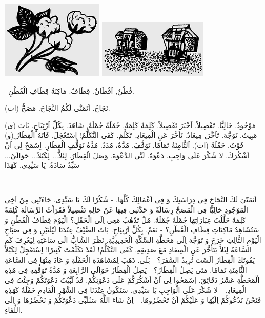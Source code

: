 \documentclass[a5paper]{article}
\begin{document}
 \includegraphics[width=1.9272in,height=1.4689in]{MuhammadBagauddinlatinized-img221.png}   \includegraphics[width=2.0626in,height=1.1043in]{MuhammadBagauddinlatinized-img222.png} 

\ قُطْنٌ, اَقْطَانٌ. قِطَافٌ. مَاكِنَةُ قِطَافِ الْقُطْنِ. 

نَجَاحٌ. اَتَمَنَّى لَكُمُ النَّجَاحَ. مَصَحٌّّ (ات).

مَوْجُودٌ. حَالِيًّا. تَفْصِيلاً. اَخْبَرَ تَفْصِيلاً. كَلِمَةً كَلِمَةً. جُمْلَةً جُمْلَةً. شَاهَدَ. بِكُلِّ اَرْتِيَاحٍ. بَاتَ (ى) مَبِيتٌ. تَوَجَّهَ. تَاَخَّرَ.ِ مِيعَادٌ. تَاَخَّرَ عَنِ الْمِيعَادِ. تَكَلَّمَ. كَفَى التَّكَلُّمُ! اِسْتَعْجَلَ. فَاتَهُ الْقِطَارُ ِ(و) فَوْتٌ. حَفْلَةٌ (ات). اَلثَّامِنَةُ تَمَامًا. تَوَقَّفَ. مُدَّةٌ، مُدَدٌ. مُدَّةُ تَوَقُّفِ الْقِطَارِ. اِسْمَحْ لِى اَنْ اَشْكُرَكَ. لا شُكْرَ عَلَى وَاجِبٍ. دَعْوَةٌ. لَبَّى الدَّعْوَةَ. وَصَلَ الْقِطَارُ. لِئَلاَّ... لِكَيْلاَ... حَوَالَىْ... سَيِّدٌ سَادَةٌ. يَا سَيِّدِى. كَهَذَا

\_\_\_\_\_\_\_\_\_\_\_\_\_\_\_\_\_\_\_\_\_\_\_\_\_\_

اَتَمَنّىَ لَكَ النَّجَاحَ فِى دِرَاسَتِكَ وَ فِى اَعْمَالِكَ كُلِّهَا. - شُكْرًا لَكَ يَا سَيِّدِى. جَاءَتْنِى مِنْ اَخِى الْمَوْجُودِ حَالِيًّا فِى الْمَصَحِّ رِسَالَةٌ وَ حَدَّثَنِى فِيهَا عَنْ حَالِهِ تَفْصِيلاً فَقَرَاْتُ الرِّسَالَةَ كَلِمَةً كَلِمَةً حَلَّلْتُ عِبَارَاتِهَا جُمْلَةً جُمْلَةً. هَلْ تَذْهُبُ مَعِى اِلَى الْحَقْلِ؟ الْيَوْمَ قِطَافُ الْقُطْنِ وَ سَتُشَاهِدُ مَاكِنَاتِ قِطَافِ الْقُطْنِ؟ - نَعَمْ, بِكُلِّ اَرْتِيَاحٍ. بَاتَ الضَّيْفُ عِنْدَنَا لَيْلَتَيْنِ وَ فِى صَبَاحِ الْيَوْمِ الثَّالِثِ خَرَجَ وَ تَوَجَّهَ اِلَى مَحَطَّةِ السِّكَّةِ الْحَدِيدِيَّةِ. نَظَرَ الشَّابُّ الَى سَاعَتِهِ لِيَعْرِفَ كَمِ السَّاعَةُ لِئَلاَّ يَتَأَخَّرَ عَنِ الْمِيعَادِ مَعَ صَدِيقِهِ. كَفَى التَّكَلُّمُ! لَقَدْ تَكَلَّمْتَ كَثِيرًا! اِسْتَعْجِلْ لِكَيْلاَ يَفُوتَكَ الْقِطَارُ اَلَسْتَ تُرِيدُ السَّفَرَ؟ - بَلَى. ذَهَبَ لِمُشَاهَدَةِ الْحَفْلَةِ وَ عَادَ مِنْهَا فِى السَّاعَةِ الثَّامِنَةِ تَمَامًا. مَتَى يَصِلُ الْقِطَارُ؟ - يَصِلُ الْقِطَارُ حَوَالَىِ الرَّابِعَةِ وَ مُدَّةُ تَوَقُّفِهِ فِى هَذِهِ الْمَحَطَّةِ عَشْرُ دَقَائِقَ. اِسْمَحُوا لِى اَنْ اَشْكُرَكُمْ عَلَى دَعْوَتِكُمْ. قَدْ لَبَّيْتُ دَعْوَتَكُمْ وَجِئْتُ فِى الْمِيعَادِ. - لا شُكْرَ عَلَى الْوَاجِبِ يَا سَيِّدِى. سَتَكُونُ عِنْدَنَا فِى الشَّهْرِ الْقَادِمِ حَفْلَةٌ كَهَذِهِ فَنَحْنُ نَدْعُوكُمْ اِلَيْهَا وَ عَلَيْكُمْ اَنْ تَحْضُرُوهَا. - اِنْ شَاءَ اللَّهُ سَنُلَبِّى دَعْوَتَكُمْ وَ نَحْضُرُهَا وَ اِلَى اللِّقَاءِ.
\end{document}
